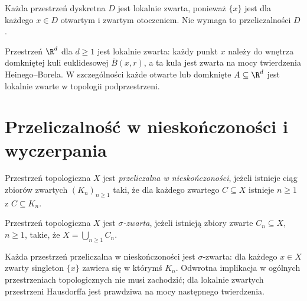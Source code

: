 \begin{przyklad}
\label{ex:topog-lokalna-podstawowe}
Każda przestrzeń dyskretna $D$ jest lokalnie
zwarta, ponieważ $\{x\}$ jest dla każdego
$x\in D$ otwartym i zwartym otoczeniem.
Nie wymaga to przeliczalności $D$.

Przestrzeń $\R^d$ dla $d\ge1$ jest lokalnie
zwarta: każdy punkt $x$ należy do wnętrza
domkniętej kuli euklidesowej
$\overline B(x,r)$, a ta kula jest zwarta
na mocy twierdzenia Heinego--Borela.
W szczególności każde otwarte lub domknięte
$A\subseteq\R^d$ jest lokalnie zwarte
w topologii podprzestrzeni.
\end{przyklad}

\section{Przeliczalność w nieskończoności i wyczerpania}
\label{sec:topog-lokalna-wyczerpania}

\begin{definicja}
\label{def:topog-lokalna-przeliczalnosc-nieskonczonosc}
Przestrzeń topologiczna $X$ jest
\emph{przeliczalna w nieskończoności},
jeżeli istnieje ciąg zbiorów zwartych
$(K_n)_{n\ge1}$ taki, że dla każdego
zwartego $C\subseteq X$ istnieje $n\ge1$
z $C\subseteq K_n$.
\end{definicja}

\begin{definicja}
\label{def:topog-lokalna-sigma-zwarta}
Przestrzeń topologiczna $X$ jest
\emph{$\sigma$-zwarta}, jeżeli istnieją
zbiory zwarte $C_n\subseteq X$, $n\ge1$,
takie, że $X=\bigcup_{n\ge1}C_n$.
\end{definicja}

\begin{uwaga}
Każda przestrzeń przeliczalna w nieskończoności
jest $\sigma$-zwarta: dla każdego $x\in X$
zwarty singleton $\{x\}$ zawiera się w
którymś $K_n$. Odwrotna implikacja
w ogólnych przestrzeniach topologicznych
nie musi zachodzić; dla lokalnie zwartych
przestrzeni Hausdorffa jest prawdziwa
na mocy następnego twierdzenia.
\end{uwaga}

